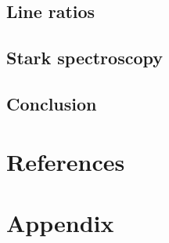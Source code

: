 \documentclass[a4paper,10pt]{article}
\begin{document}
		\subsection{Line ratios}
		
		\subsection{Stark spectroscopy}

		\subsection{Conclusion}
		
	\section{References}

		
		

	\section{Appendix}
\end{document}
